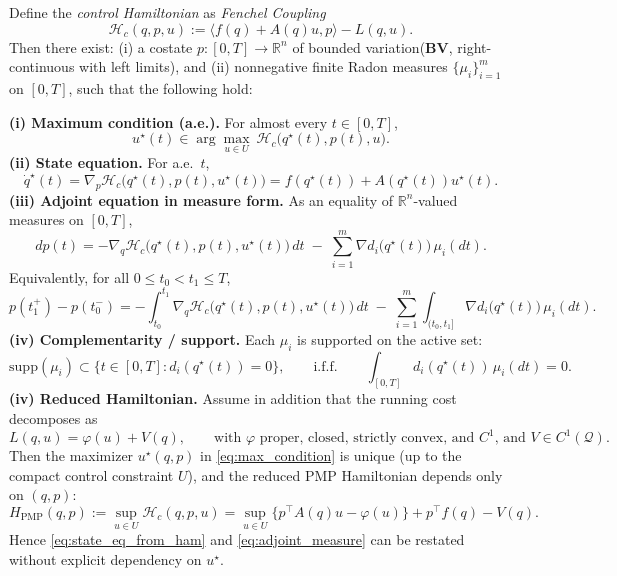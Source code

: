 \begin{lemma}
Define the \emph{control Hamiltonian} as \textit{Fenchel Coupling}
\begin{equation}
\mathcal{H}_c(q,p,u):=\langle f(q)+A(q)u, p\rangle-L(q,u).
\label{eq:def_control_ham}
\end{equation}
Then there exist:
(i) a costate $p:[0,T]\to\mathbb{R}^n$ of bounded variation(\textbf{BV}, right-continuous with left limits),
and (ii) nonnegative finite Radon measures $\{\mu_i\}_{i=1}^m$ on $[0,T]$,
such that the following hold:

\smallskip
\noindent\textbf{(i) Maximum condition (a.e.).}
For almost every $t\in[0,T]$,
\begin{equation}
u^\star(t)\in \arg\max_{u\in U}\ \mathcal{H}_c\big(q^\star(t),p(t),u\big).
\label{eq:max_condition}
\end{equation}
\noindent\textbf{(ii) State equation.}
For a.e.\ $t$,
\begin{equation}
\dot q^\star(t)=\nabla_p \mathcal{H}_c\big(q^\star(t),p(t),u^\star(t)\big)
= f(q^\star(t))+A(q^\star(t))u^\star(t).
\label{eq:state_eq_from_ham}
\end{equation}
\noindent\textbf{(iii) Adjoint equation in measure form.}
As an equality of $\mathbb{R}^n$-valued measures on $[0,T]$,
\begin{equation}
dp(t)= -\nabla_q \mathcal{H}_c\big(q^\star(t),p(t),u^\star(t)\big)\,dt
\;-\;\sum_{i=1}^m \nabla d_i\big(q^\star(t)\big)\,\mu_i(dt).
\label{eq:adjoint_measure}
\end{equation}
Equivalently, for all $0\le t_0<t_1\le T$,
\begin{equation}
p(t_1^+)-p(t_0^-)
= -\int_{t_0}^{t_1}\nabla_q \mathcal{H}_c\big(q^\star(t),p(t),u^\star(t)\big)\,dt
\;-\;\sum_{i=1}^m \int_{(t_0,t_1]} \nabla d_i\big(q^\star(t)\big)\,\mu_i(dt).
\label{eq:adjoint_integral}
\end{equation}
\noindent\textbf{(iv) Complementarity / support.}
Each $\mu_i$ is supported on the active set:
\begin{equation}
\mathrm{supp}(\mu_i)\subset \{t\in[0,T]: d_i(q^\star(t))=0\},
\qquad\text{i.f.f.}\qquad
\int_{[0,T]} d_i(q^\star(t))\,\mu_i(dt)=0.
\label{eq:complementarity_measure}
\end{equation}
\noindent\textbf{(iv) Reduced Hamiltonian.} Assume in addition that the running cost decomposes as
\begin{equation}
L(q,u)=\varphi(u)+V(q),
\qquad\text{with $\varphi$ proper, closed, strictly convex, and $C^1$, and $V\in C^1(\mathcal Q)$.}
\label{eq:cost_split_B_statecon}
\end{equation}
Then the maximizer $u^\star(q,p)$ in \cref{eq:max_condition} is unique (up to the compact control constraint $U$),
and the reduced PMP Hamiltonian depends only on $(q,p)$:
\begin{equation}
\label{eq:def_reduced_ham_pmp_statecon}
H_{\mathrm{PMP}}(q,p)
:=\sup_{u\in U}\mathcal H_c(q,p,u)
=\sup_{u\in U}\big\{p^\top A(q)u-\varphi(u)\big\}+p^\top f(q)-V(q).
\end{equation}
Hence \cref{eq:state_eq_from_ham} and \cref{eq:adjoint_measure} can be restated without explicit dependency on $u^\star$.
\end{lemma}

